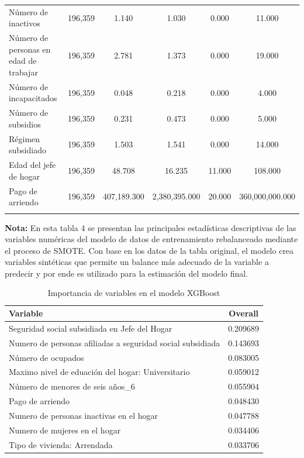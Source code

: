 \documentclass[a4paper]{article}
\theoremstyle{remark}
\theoremstyle{definition}
\begin{document}
\begin{table}[!htbp]
{\begin{tabular}{@{\extracolsep{5pt}}lccccc}
  Número de inactivos & 196,359 & 1.140 & 1.030 & 0.000 & 11.000 \\ 
  Número de personas en edad de trabajar & 196,359 & 2.781 & 1.373 & 0.000 & 19.000 \\ 
  Número de incapacitados & 196,359 & 0.048 & 0.218 & 0.000 & 4.000 \\ 
  Número de subsidios & 196,359 & 0.231 & 0.473 & 0.000 & 5.000 \\ 
  Régimen subsidiado & 196,359 & 1.503 & 1.541 & 0.000 & 14.000 \\ 
  Edad del jefe de hogar & 196,359 & 48.708 & 16.235 & 11.000 & 108.000 \\ 
  Pago de arriendo & 196,359 & 407,189.300 & 2,380,395.000 & 20.000 & 360,000,000.000 \\ 
  \hline \\[-1.8ex] 
  \end{tabular}
  }
\end{table} 
\scriptsize{\textbf{Nota:} En esta tabla 4 se presentan las principales estadísticas descriptivas de las variables numéricas del modelo de datos de entrenamiento rebalanceado mediante el proceso de SMOTE. Con base en los datos de la tabla original, el modelo crea variables sintéticas que permite un balance más adecuado de la variable a predecir y por ende es utilizado para la estimación del modelo final.}

\begin{table}[h!]
\centering
\caption{Importancia de variables en el modelo XGBoost}
\label{tab:importancia_variables}
\begin{tabular}{|l|c|}
\hline
\textbf{Variable}                   & \textbf{Overall} \\ \hline
Seguridad social subsidiada en Jefe del Hogar             & 0.209689         \\ \hline
Numero de personas afiliadas a seguridad social subsidiada                         & 0.143693         \\ \hline
Número de ocupados                           & 0.083005         \\ \hline
Maximo nivel de eduación del hogar: Universitario           & 0.059012         \\ \hline
Número de menores de seis años\_6                         & 0.055904         \\ \hline
Pago de arriendo                      & 0.048430         \\ \hline
Numero de personas inactivas en el hogar                           & 0.047788         \\ \hline
Numero de mujeres en el hogar                            & 0.034406         \\ \hline
Tipo de vivienda: Arrendada                     & 0.033706         \\ \hline
\end{tabular}
\end{table}
\end{document}
